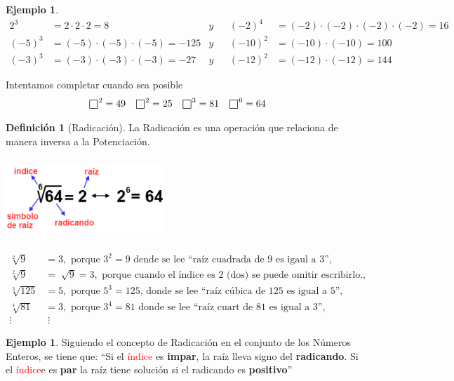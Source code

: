 \documentclass[12pt]{examdesign}
\theoremstyle{plain}
\theoremstyle{definition}
\newtheorem{exa}[theorem]{Ejemplo}
\newtheorem{defi}[theorem]{Definición}
\theoremstyle{remark}
\def\msquare{\mathord{\scalerel*{\Box}{gX}}}
\begin{document}
\begin{endmatter}
\begin{tcolorbox}[opteqC]
\begin{exa}
				\begin{align*}
				2^{3} &=2\cdot 2\cdot 2=8&y&& (-2)^{4}&=(-2)\cdot(-2)\cdot(-2)\cdot(-2)=16\\
				(-5)^{3} &= (-5)\cdot(-5)\cdot(-5)=-125&y&& (-10)^{2}&=(-10)\cdot(-10)=100\\
				(-3)^{3} &=(-3)\cdot(-3)\cdot(-3)=-27&y&& (-12)^{2} &= (-12)\cdot(-12)=144
				\end{align*}
			\end{exa}
		\end{tcolorbox}
		\vspace{.2cm}
		Intentamos completar cuando sea posible
		\begin{align*}
		\msquare^{2} &=49&\msquare^{2} &=25 &\msquare^{3} &=81&\msquare^{6} &=64
		\end{align*}
		\begin{tcolorbox}[colback=red!10!white, colframe=tealgreen, title=\textbf{Material de consulta}]
			\begin{defi}[Radicación]
				La Radicación es una operación que relaciona de manera inversa a la Potenciación.
				\begin{center}
					\includegraphics[width=6cm, height=3cm]{images.png}
				\end{center}
				\begin{align*}
				\sqrt[2]{9}&=3,\mbox{ porque $3^{2}=9$ dende se lee ``raíz cuadrada de 9 es igaul a 3''},\\
				\sqrt[2]{9}&=\sqrt[]{9}=3,\mbox{ porque cuando el índice es 2 (dos) se puede omitir escribirlo.},\\
				\sqrt[3]{125}&=5,\mbox{ porque $5^{3}=125$, donde se lee ``raíz cúbica de 125 es igual a 5''},\\
				\sqrt[4]{81}&=3,\mbox{ porque $3^{4}=81$ donde se lee ``raíz cuart de 81 es igual a 3''},\\
				\vdots&\;\vdots
				\end{align*} 
			\end{defi}
		\end{tcolorbox}
		\vspace{.2cm}
		
		\begin{tcolorbox}[opteqC]
			\begin{exa}
				Siguiendo el concepto de Radicación en el conjunto de los Números Enteros, se tiene que: ``Si el \textcolor{red}{índice} es \textbf{impar}, la raíz lleva signo del \textbf{radicando}. Si el \textcolor{red}{índice}e es \textbf{par} la raíz tiene solución si el radicando es \textbf{positivo}''
				

\end{exa}
\end{tcolorbox}
\end{endmatter}
\end{document}

